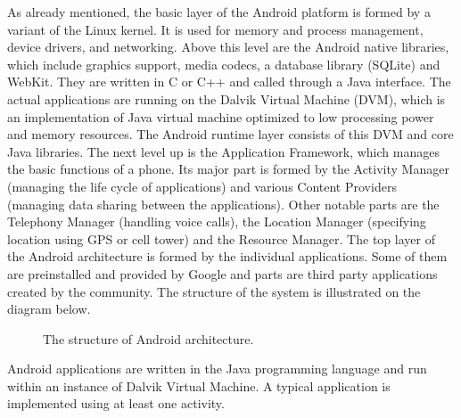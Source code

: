 As already mentioned, the basic layer of the Android platform is formed by a variant of the Linux kernel. 
It is used for memory and process management, device drivers, and networking.
Above this level are the Android native libraries, which include graphics support, media codecs, a database library (SQLite) and WebKit.
They are written in C or C++ and called through a Java interface.
The actual applications are running on the Dalvik Virtual Machine (DVM), which is an implementation of Java virtual machine optimized to low processing power and memory resources.
The Android runtime layer consists of this DVM and core Java libraries. 
The next level up is the Application Framework, which manages the basic functions of a phone. 
Its major part is formed by the Activity Manager (managing the life cycle of applications) and various Content Providers (managing data sharing between the applications).
Other notable parts are the Telephony Manager (handling voice calls), the Location Manager (specifying location using GPS or cell tower) and the Resource Manager.
The top layer of the Android architecture is formed by the individual applications.
Some of them are preinstalled and provided by Google and parts are third party applications created by the community.
The structure of the system is illustrated on the diagram below. 
\begin{figure}[h!]
    \caption{The structure of Android architecture.}
\end{figure}
Android applications are written in the Java programming language and run within an instance of Dalvik Virtual Machine.
A typical application is implemented using at least one activity. 
